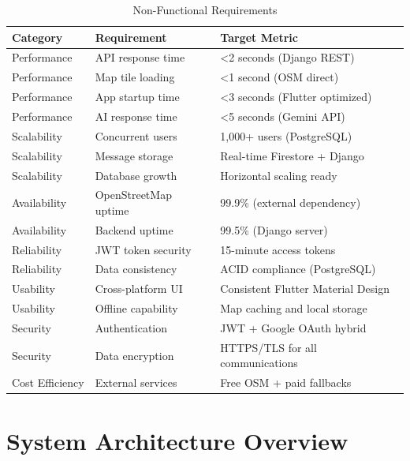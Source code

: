\begin{table}[h!]
    \centering
    \caption{Non-Functional Requirements}
    \label{tab:nonfunctional_requirements}
    \begin{tabular}{lll}     
        \toprule
        Category & Requirement & Target Metric \\
        \midrule
        Performance & API response time & <2 seconds (Django REST) \\
        Performance & Map tile loading & <1 second (OSM direct) \\
        Performance & App startup time & <3 seconds (Flutter optimized) \\
        Performance & AI response time & <5 seconds (Gemini API) \\
        Scalability & Concurrent users & 1,000+ users (PostgreSQL) \\
        Scalability & Message storage & Real-time Firestore + Django \\
        Scalability & Database growth & Horizontal scaling ready \\
        Availability & OpenStreetMap uptime & 99.9\% (external dependency) \\
        Availability & Backend uptime & 99.5\% (Django server) \\
        Reliability & JWT token security & 15-minute access tokens \\
        Reliability & Data consistency & ACID compliance (PostgreSQL) \\
        Usability & Cross-platform UI & Consistent Flutter Material Design \\
        Usability & Offline capability & Map caching and local storage \\
        Security & Authentication & JWT + Google OAuth hybrid \\
        Security & Data encryption & HTTPS/TLS for all communications \\
        Cost Efficiency & External services & Free OSM + paid fallbacks \\
        \bottomrule
    \end{tabular}
\end{table}

\section{System Architecture Overview}
\label{sec:system_architecture}

